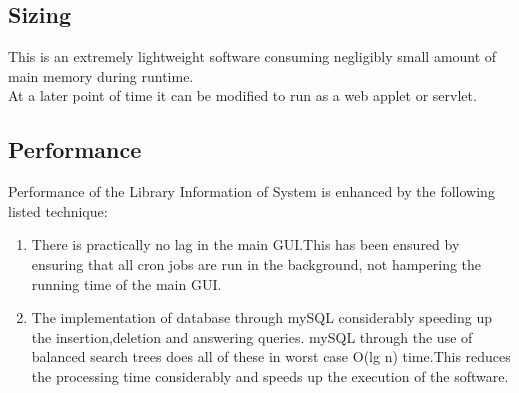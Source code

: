 \documentclass[a4paper]{article}
\begin{document}
\subsection{Sizing}
This is an extremely lightweight software consuming negligibly small amount of main memory during runtime.\\ 
At a later point of time it can be modified to run as a web applet or servlet. 

\subsection{Performance}
Performance of the Library Information of System is enhanced by the following listed technique:
\begin{enumerate}
\item There is practically no lag in the main GUI.This has been ensured by 
ensuring that all cron jobs are run in the background, not hampering the running time of the main GUI.
\item The implementation of database through mySQL considerably speeding up the insertion,deletion and answering queries. mySQL through the use of balanced search trees does all of these in worst case O(lg n) time.This reduces the processing time considerably and speeds up the execution of the software. 

\end{enumerate}
\end{document}
